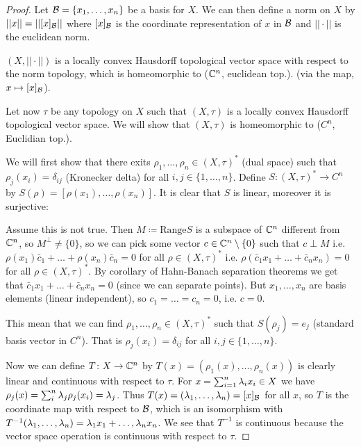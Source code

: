 \documentclass[10pt,english,a4paper]{article}
\theoremstyle{definition}
\begin{document}
\begin{proof}
    Let $\mathcal{B} = \{x_1,\ldots, x_n\}$ be a basis for $X$. We can then define a 
norm on $X$ by $||x|| = ||[x]_{\mathcal{B}}||$ where $[x]_{\mathcal{B}}$ is the coordinate
representation of $x$ in $\mathcal{B}$ and $||\cdot ||$ is the euclidean norm. 

$(X, ||\cdot ||)$ is a locally convex Hausdorff topological vector space with 
respect to the norm topology, which is homeomorphic to ($\mathbb{C}^n$, euclidean top.). 
(via the map, $x\mapsto [x]_{\mathcal{B}}$). 

Let now $\tau$ be any topology on $X$ such that $(X,\tau)$ is a locally 
convex Hausdorff topological vector space. We will show that $(X,\tau)$
is homeomorphic to ($C^n$,  Euclidian top.).

We will first show that there exits $\rho_1,\ldots, \rho_n \in (X,\tau)^{*}$
(dual space) such that $\rho_j(x_i) = \delta_{ij}$ (Kronecker delta) for all 
$i,j \in \{1,\ldots, n\}$. Define $S\colon (X,\tau)^* \to C^n$
by $S(\rho) = [\rho(x_1),\ldots, \rho(x_n)]$. It is clear that $S$ is linear,
moreover it is surjective:

Assume this is not true. Then $M \coloneqq \text{Range}S$ is a subspace of $\mathbb{C}^n$
different from $\mathbb{C}^n$, so $M^{\perp}\neq \{0\}$, so we can pick some vector 
$c \in \mathbb{C}^n \setminus \{0\}$ such that $c\perp M$ i.e. $\rho(x_1)\bar{c}_1 + 
\ldots + \rho(x_n)\bar{c}_n = 0$ for all $\rho \in (X, \tau)^*$ i.e.
$\rho(\bar{c}_1x_1 + \ldots + \bar{c}_n x_n) =  0 $ for all $\rho \in (X,\tau)^*$.
By corollary of Hahn-Banach separation theorems we get that 
$\bar{c}_1 x_1 + \ldots + \bar{c}_n x_n  = 0$ (since we can separate points).
But $x_1,\ldots, x_n$ are basis elements (linear independent), so 
$c_1 = \ldots = c_n = 0$, i.e. $c=0$.

This mean that we can find $\rho_1,\ldots, \rho_n \in (X,\tau)^*$
such that $S(\rho_j) = e_j $ (standard basis vector in $C^n$).
That is $\rho_{j}(x_i) =\delta_{ij}$ for all $i,j \in \{1,\ldots,n\}$.

Now we can define $T\colon X \to \mathbb{C}^n$ by $T(x) = (\rho_1 (x),\ldots,
\rho_n(x))$ is clearly linear and continuous with respect to $\tau$.  For $x =
\sum_{i=1}^{n}\lambda_i x_i \in X$ we have $\rho_{j}(x) =\sum_{i}^{n}
\lambda_{j}\rho_j(x_i) = \lambda_j$. Thus $T(x) = (\lambda_1,\ldots,\lambda_n) = [x]_{\mathcal{B}}$ for
all $x$, so $T$ is the coordinate map with respect to $\mathcal{B}$, which is an
isomorphism with $T^{-1}(\lambda_1,\ldots,\lambda_n) = \lambda_1x_1 + \ldots, \lambda_nx_n$. We
see that $T^{-1}$ is continuous because the vector space operation is
continuous with respect to $\tau$.




\end{proof}
\end{document}
